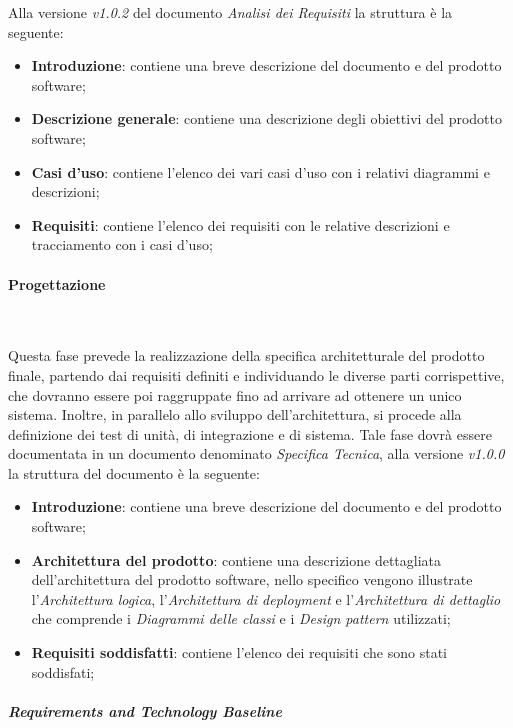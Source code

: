     Alla versione \textit{v1.0.2} del documento \textit{Analisi dei Requisiti} la struttura è la seguente:
    \begin{itemize}
        \item \textbf{Introduzione}: contiene una breve descrizione del documento e del prodotto software;
        \item \textbf{Descrizione generale}: contiene una descrizione degli obiettivi del prodotto software;
        \item \textbf{Casi d'uso}: contiene l'elenco dei vari casi d'uso con i relativi diagrammi e descrizioni;
        \item \textbf{Requisiti}: contiene l'elenco dei requisiti con le relative descrizioni e tracciamento con i casi d'uso;
    \end{itemize}

\paragraph{Progettazione}~

\noindent Questa fase prevede la realizzazione della specifica architetturale del prodotto finale, partendo dai requisiti definiti e individuando le diverse parti corrispettive, che dovranno essere poi raggruppate fino ad arrivare ad ottenere un unico sistema. \newline
Inoltre, in parallelo allo sviluppo dell'architettura, si procede alla definizione dei test di unità, di integrazione e di sistema. \newline
Tale fase dovrà essere documentata in un documento denominato \textit{Specifica Tecnica}, alla versione \textit{v1.0.0} la struttura del documento è la seguente:
\begin{itemize}
    \item \textbf{Introduzione}: contiene una breve descrizione del documento e del prodotto software;
    \item \textbf{Architettura del prodotto}: contiene una descrizione dettagliata dell'architettura del prodotto software, nello specifico vengono illustrate l'\textit{Architettura logica}, l'\textit{Architettura di deployment} e l'\textit{Architettura di dettaglio} che comprende i \textit{Diagrammi delle classi} e i \textit{Design pattern} utilizzati;
    \item \textbf{Requisiti soddisfatti}: contiene l'elenco dei requisiti che sono stati soddisfati;
\end{itemize}

\subparagraph{Requirements and Technology Baseline}~

